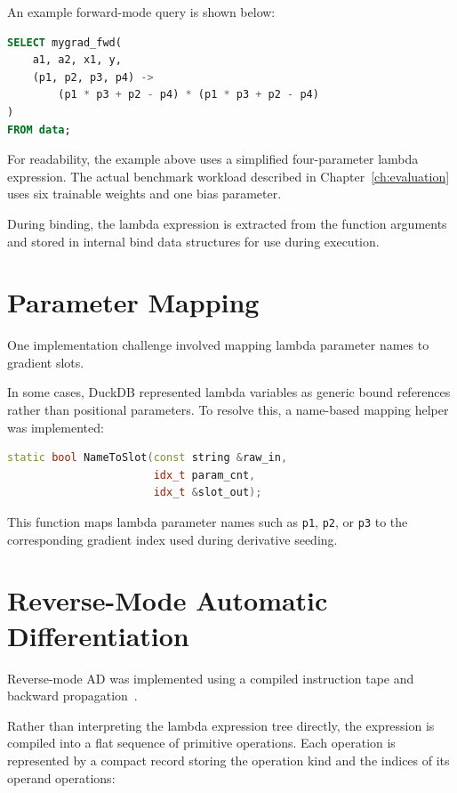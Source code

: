 \documentclass[12pt]{report}
\begin{document}
An example forward-mode query is shown below:

\begin{lstlisting}[language=SQL]
SELECT mygrad_fwd(
    a1, a2, x1, y,
    (p1, p2, p3, p4) ->
        (p1 * p3 + p2 - p4) * (p1 * p3 + p2 - p4)
)
FROM data;
\end{lstlisting}

For readability, the example above uses a simplified four-parameter lambda expression. The actual benchmark workload described in Chapter~\ref{ch:evaluation} uses six trainable weights and one bias parameter.

During binding, the lambda expression is extracted from the function arguments and stored in internal bind data structures for use during execution.

\section{Parameter Mapping}

One implementation challenge involved mapping lambda parameter names to gradient slots.

In some cases, DuckDB represented lambda variables as generic bound references rather than positional parameters. To resolve this, a name-based mapping helper was implemented:

\begin{lstlisting}[language=C++]
static bool NameToSlot(const string &raw_in,
                       idx_t param_cnt,
                       idx_t &slot_out);
\end{lstlisting}

This function maps lambda parameter names such as \texttt{p1}, \texttt{p2}, or \texttt{p3} to the corresponding gradient index used during derivative seeding.

\section{Reverse-Mode Automatic Differentiation}

Reverse-mode AD was implemented using a compiled instruction tape and backward propagation~\cite{baydin2017automatic}.

Rather than interpreting the lambda expression tree directly, the expression is compiled into a flat sequence of primitive operations. Each operation is represented by a compact record storing the operation kind and the indices of its operand operations:
\end{document}
